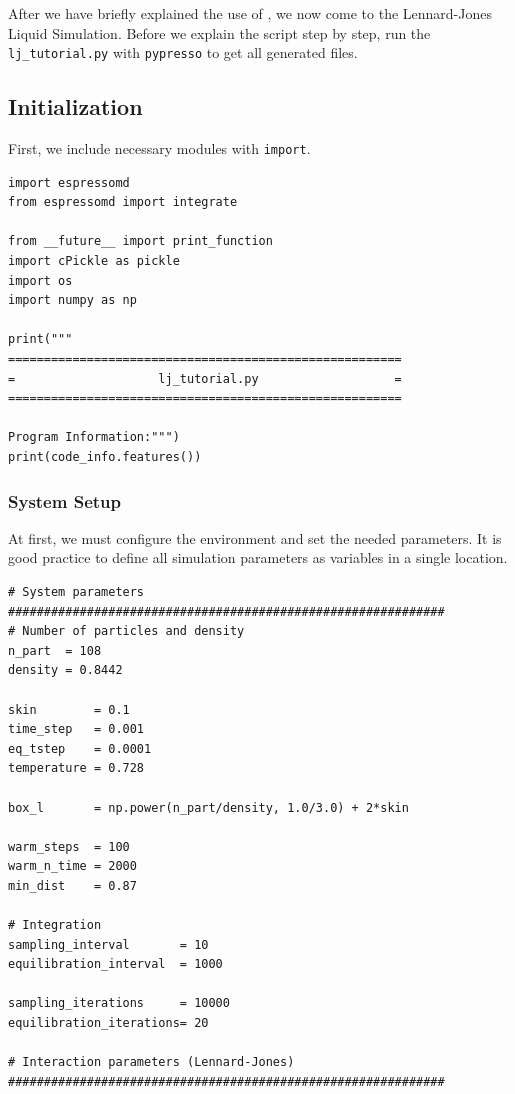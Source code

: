 \documentclass[
paper=a4,                       %
fontsize=11pt,                  %
twoside,                        %
footsepline,                    %
headsepline,                    %
headinclude=false,              %
footinclude=false,              %
pagesize,                       %
]{scrartcl}
\begin{document}
After we have briefly explained the use of \es{}, we now come to the
Lennard-Jones Liquid Simulation.  Before we explain the script step by step, run the
\texttt{lj\_tutorial.py}  with \texttt{pypresso} to get all generated files.


\subsection{Initialization}

First, we include necessary modules with \lstinline|import|.
{\small\vspace{0,2cm}
\begin{lstlisting}
import espressomd
from espressomd import integrate

from __future__ import print_function
import cPickle as pickle
import os 
import numpy as np

print("""
=======================================================
=                    lj_tutorial.py                   =
=======================================================

Program Information:""")
print(code_info.features())
\end{lstlisting}\vspace{0,2cm}

\subsubsection{System Setup}
At first, we must configure the environment and set the needed parameters.
It is good practice to define all simulation parameters as variables in a single location.
{\small\vspace{0,2cm}
\begin{lstlisting}
# System parameters
#############################################################
# Number of particles and density
n_part  = 108
density = 0.8442

skin        = 0.1
time_step   = 0.001 
eq_tstep    = 0.0001
temperature = 0.728

box_l       = np.power(n_part/density, 1.0/3.0) + 2*skin

warm_steps  = 100
warm_n_time = 2000
min_dist    = 0.87

# Integration
sampling_interval       = 10
equilibration_interval  = 1000

sampling_iterations     = 10000
equilibration_iterations= 20

# Interaction parameters (Lennard-Jones)
#############################################################


\end{lstlisting}}}
\end{document}

